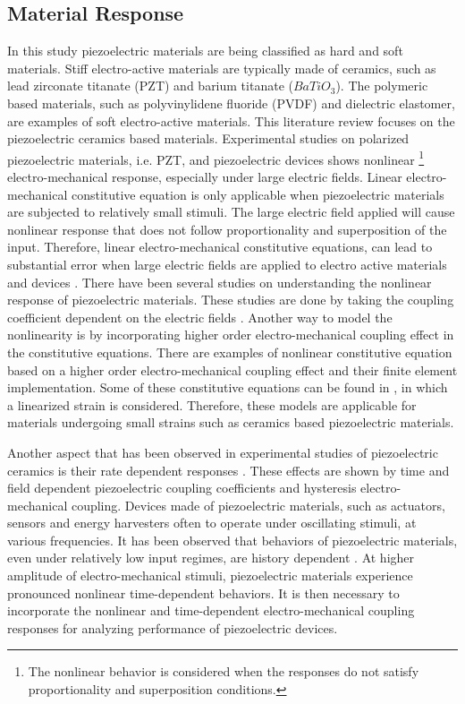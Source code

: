 \subsection{Material Response}
In this study piezoelectric materials are being classified as hard and soft materials. 
Stiff electro-active materials are typically made of ceramics, such as lead zirconate titanate (PZT) and barium titanate ($BaTiO_3$).
The polymeric based materials, such as polyvinylidene fluoride (PVDF) and dielectric elastomer, are examples of soft electro-active materials. 
This literature review focuses on the piezoelectric ceramics based materials. 
Experimental studies on polarized piezoelectric materials, i.e. PZT, and piezoelectric devices \cite{Crawley1990,Ardelean2004,anderson1989piezoceramic} shows nonlinear \footnote{The nonlinear behavior is considered when the responses do not satisfy proportionality and superposition conditions.} electro-mechanical response, especially under large electric fields. 
Linear electro-mechanical constitutive equation is only applicable when piezoelectric materials are subjected to relatively small stimuli.
The large electric field applied will cause nonlinear response that does not follow proportionality and superposition of the input.
Therefore, linear electro-mechanical constitutive equations, can lead to substantial error when large electric fields are applied to electro active 
materials and devices \cite{Hall2001}. 
There have been several studies on understanding the nonlinear response of piezoelectric materials.
These studies are done by taking the coupling coefficient dependent on the electric fields \cite{Crawley1990}.
Another way to model the nonlinearity is by incorporating higher order electro-mechanical coupling effect in the constitutive equations. 
There are examples of nonlinear constitutive equation based on a higher order electro-mechanical coupling effect and their finite element implementation.
Some of these constitutive equations can be found in \cite{Bassiouny19881297,tiersten1993electroelastic,Maugin2010,Muliana2011a,Sohrabi2011},
 in which a linearized strain is considered.
Therefore, these models are applicable for materials undergoing small strains such as ceramics based piezoelectric materials.

Another aspect that has been observed in experimental studies of piezoelectric ceramics is their rate dependent responses \cite{Zhou2010,Zhou2006}. 
These effects are shown by time and field dependent piezoelectric coupling coefficients and hysteresis electro-mechanical coupling. 
Devices made of piezoelectric materials, such as actuators, sensors and energy harvesters often to operate under oscillating stimuli, 
at various frequencies. 
It has been observed that behaviors of piezoelectric materials, even under relatively low input regimes, are history dependent \cite{Crawley1990,anderson1989piezoceramic}. 
At higher amplitude of electro-mechanical stimuli, piezoelectric materials experience pronounced nonlinear time-dependent behaviors. 
It is then necessary to incorporate the nonlinear and time-dependent electro-mechanical coupling responses for analyzing performance of piezoelectric devices.
 
